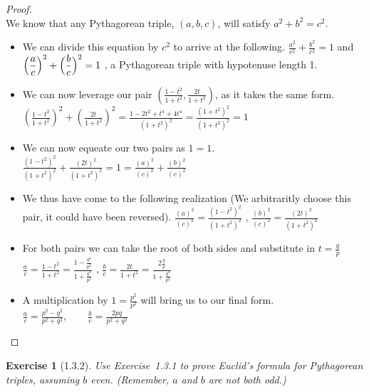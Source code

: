 \documentclass[10pt]{article}
\theoremstyle{plain}
\newtheorem{ex}{Exercise}
\begin{document}
\begin{proof}
  \ \\
  We know that any Pythagorean triple, $(a,b,c)$,  will satisfy $a^{2}+b^{2}=c^{2}$.
  \begin{itemize}
    \item We can divide this equation by $c^2$ to arrive at the following.
    \subitem  $\displaystyle \frac{a^{2}}{c^{2}}+\frac{b^{2}}{c^{2}}=1$ and $\displaystyle \Bigl(\frac{a}{c}\Bigr)^{2}+\Bigl(\frac{b}{c}\Bigr)^{2}=1$ , a Pythagorean triple with hypotenuse length 1.
    \item We can now leverage our pair $\displaystyle \left(\frac{1-t^2}{1+t^2},\frac{2t}{1+t^2}\right)$, as it takes the same form.
    \subitem $\displaystyle \left(\frac{1-t^2}{1+t^2}\right)^{2}+\left(\frac{2t}{1+t^2}\right)^{2} = \frac{1-2t^{2}+t^{4}+4t^{4}}{(1+t^2)^{2}} = \frac{(1+t^2)^{2}}{(1+t^2)^{2}} = 1$
    \item We can now equeate our two pairs as $1=1$.
    \subitem $\displaystyle \frac{(1-t^2)^{2}}{(1+t^2)^{2}}+\frac{(2t)^{2}}{(1+t^2)^{2}} = 1 = \frac{(a)^{2}}{(c)^{2}}+\frac{(b)^{2}}{(c)^{2}}$
    \item We thus have come to the following realization (We arbitraritly choose this pair, it could have been reversed).
    \subitem $\displaystyle \frac{(a)^{2}}{(c)^{2}}=\frac{(1-t^2)^{2}}{(1+t^2)^{2}}$ , $\displaystyle \frac{(b)^{2}}{(c)^{2}}=\frac{(2t)^{2}}{(1+t^2)^{2}}$
    \item For both pairs we can take the root of both sides and substitute in $\displaystyle t=\frac{q}{p}$
    \subitem $\displaystyle \frac{a}{c}=\frac{1-t^2}{1+t^2}=\frac{1-\frac{q^{2}}{p^{2}}}{1+\frac{q^{2}}{p^{2}}}$ , $\displaystyle \frac{b}{c}=\frac{2t}{1+t^2}=\frac{2\frac{q}{p}}{1+\frac{q^{2}}{p^{2}}}$
    \item A multiplication by $1 = \frac{p^{2}}{p^{2}}$ will bring us to our final form.
    \subitem $\displaystyle \frac{a}{c}=\frac{p^2-q^2}{p^2+q^2},\qquad\frac{b}{c}=\frac{2pq}{p^2+q^2}$
  \end{itemize}
\end{proof}

\hrulefill

\begin{ex} [1.3.2]
  Use Exercise~1.3.1 to prove Euclid's formula for Pythagorean triples, assuming $b$ even. (Remember, $a$ and $b$ are not both odd.)
\end{ex}
\end{document}

